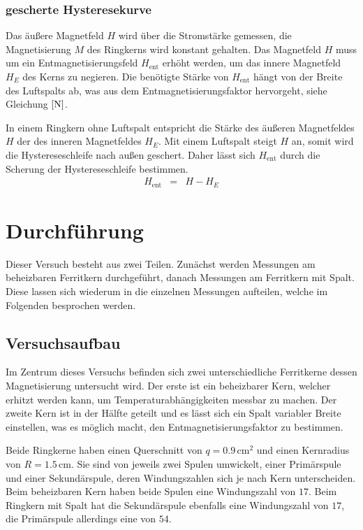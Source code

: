 \documentclass[12pt,a4paper]{scrartcl}
\numberwithin{equation}{section} %
\renewcommand{\[}{} %
\renewcommand{\]}{\noindent} %
\begin{document}
\hypertarget{gescherte-hysteresekurve}{%
\subsubsection{gescherte Hysteresekurve}\label{gescherte-hysteresekurve}}
Das äußere Magnetfeld \(H\) wird über die Stromstärke gemessen, die Magnetisierung \(M\) des Ringkerns wird konstant gehalten. Das Magnetfeld \(H\) muss um ein Entmagnetisierungsfeld \(H_\mathrm{ent}\) erhöht werden, um das innere Magnetfeld \(H_E\) des Kerns zu negieren. Die benötigte Stärke von \(H_\mathrm{ent}\) hängt von der Breite des Luftspalts ab, was aus dem Entmagnetisierungsfaktor hervorgeht, siehe Gleichung \(\eqref{N}\).

In einem Ringkern ohne Luftspalt entspricht die Stärke des äußeren Magnetfeldes \(H\) der des inneren Magnetfeldes \(H_E\). Mit einem Luftspalt steigt \(H\) an, somit wird die Hystereseschleife nach außen geschert. Daher lässt sich \(H_\mathrm{ent}\) durch die Scherung der Hystereseschleife bestimmen. 
\begin{eqnarray}
    H_\mathrm{ent} &=& H - H_E \label{Hscher}
\end{eqnarray}

\clearpage
\hypertarget{durchfuxfchrung}{%
\section{Durchführung}\label{durchfuxfchrung}}
Dieser Versuch besteht aus zwei Teilen. Zunächst werden Messungen am beheizbaren Ferritkern durchgeführt, danach Messungen am Ferritkern mit Spalt. Diese lassen sich wiederum in die einzelnen Messungen aufteilen, welche im Folgenden besprochen werden.

\hypertarget{versuchsaufbau}{%
\subsection{Versuchsaufbau}\label{versuchsaufbau}}
Im Zentrum dieses Versuchs befinden sich zwei unterschiedliche Ferritkerne dessen Magnetisierung untersucht wird. Der erste ist ein beheizbarer Kern, welcher erhitzt werden kann, um Temperaturabhängigkeiten messbar zu machen. Der zweite Kern ist in der Hälfte geteilt und es lässt sich ein Spalt variabler Breite einstellen, was es möglich macht, den Entmagnetisierungsfaktor zu bestimmen.

Beide Ringkerne haben einen Querschnitt von \(q=0.9\,\mathrm{cm^2}\) und einen Kernradius von \(R=1.5\,\mathrm{cm}\). Sie sind von jeweils zwei Spulen umwickelt, einer Primärspule und einer Sekundärspule, deren Windungszahlen sich je nach Kern unterscheiden. Beim beheizbaren Kern haben beide Spulen eine Windungszahl von \(17\). Beim Ringkern mit Spalt hat die Sekundärspule ebenfalls eine Windungszahl von \(17\), die Primärspule allerdings eine von \(54\).
\end{document}
